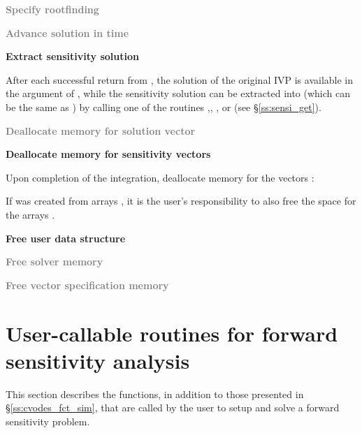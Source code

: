\begin{Steps}
\item
  \textcolor{gray}{\bf Specify rootfinding}

\item
  \textcolor{gray}{\bf Advance solution in time}

\item
  {\bf Extract sensitivity solution}

  After each successful return from , the solution of the
  original IVP is available in the  argument of ,
  while the sensitivity solution can be extracted into  (which can 
  be the same as ) by calling one of the routines 
  ,, , or 
  (see \S\ref{ss:sensi_get}).

\item
  \textcolor{gray}{\bf Deallocate memory for solution vector}

\item 
  {\bf Deallocate memory for sensitivity vectors}

  Upon completion of the integration, deallocate memory for the vectors :

  {\s} 

  {\p} 

  If  was created from  arrays , it is the
  user's responsibility to also free the space for the arrays .

\item
  {\bf Free user data structure}

\item
  \textcolor{gray}{\bf Free solver memory}
  
\item
  \textcolor{gray}{\bf Free vector specification memory}

\end{Steps}

\section{User-callable routines for forward sensitivity analysis}

This section describes the {\cvodes} functions, in addition to those presented
in \S\ref{ss:cvodes_fct_sim}, that are called by the user to setup and solve
a forward sensitivity problem.

